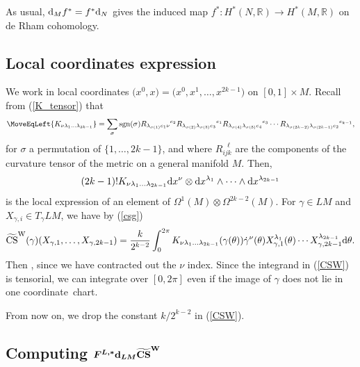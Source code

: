 \documentclass[pdftex]{sigma}
\numberwithin{equation}{section}
\theoremstyle{definition}
\newcommand{\BbR}{{\mathbb R}}
\newcommand{\R}{\BbR}
\newcommand{\bm}{ M}
\newcommand{\ocs}{\widetilde{{\rm CS}}}
\newcommand{\sgn}{{\rm sgn}}
\newcommand{\itbm}{[0,1]\times M}
\begin{document}
As usual, ${\rm d}_Mf^* = f^*{\rm d}_N$ gives the induced map $f^*\colon H^*(N,\R) \to H^*(M,\R)$ on de Rham cohomology.

\subsection{Local coordinates expression}%

We work in local coordinates
$\bigl(x^0, x\bigr) = \bigl(x^0, x^1,\dots, x^{2k-1}\bigr)$ on $\itbm$.
Recall from (\ref{K_tensor}) that%
\begin{align*}%
\MoveEqLeft{ K_{\nu \lambda_1 \dots \lambda_{2k-1}} }
= \sum_{\sigma } \sgn({\sigma})
R_{\lambda_{\sigma (1)} e_1 \nu}{}^{e_{2}}
R_{\lambda_{\sigma (2) } \lambda_{\sigma (3)} e_{3}}{}^{e_1}
R_{\lambda_{\sigma (4) } \lambda_{\sigma (5)} e_{4}}{}^{e_{3}}
\cdots
R_{\lambda_{\sigma (2k-2) } \lambda_{\sigma (2k-1)} e_{2}}{}^{e_{k-1}},
\nonumber
\end{align*}
for $\sigma$ a permutation of $\{1,\dots,2k-1\}$, and where $R_{ijk}^{\ \ \ \ell}$ are the components of the curvature tensor of the metric on a general manifold $M$. Then,
\begin{equation}\label{K}(2k-1)! K_{\nu \lambda_1 \dots \lambda_{2k-1}}{\rm d}x^\nu\otimes {\rm d}x^{\lambda_1}\wedge\cdots\wedge {\rm d}x^{\lambda_{2k-1}}
\end{equation}
is the local expression of an element of
$\Omega^1( {\bm}) \otimes \Omega^{2k-2} (\bm)$.
For $\gamma\in L\bm$ and $X_{\gamma,i}\in T_\gamma L\bm$, we have by (\ref{csg})
\begin{equation}
\label{CSW}
\ocs^{\rm W} (\gamma ) (X_{\gamma, 1} ,\dots, X_{\gamma , 2k-1}) \\
= \frac{k}{2^{k-2}}\int_0^{2\pi}
 K_{\nu \lambda_1 \dots \lambda_{2k-1}} (\gamma (\theta))
{\dot \gamma}^{\nu} (\theta )
X_{\gamma ,1}^{\lambda_{1}}(\theta ) \cdots X_{\gamma , 2k-1}^{\lambda_{2k-1}}
 {\rm d}\theta.
\end{equation}
Then \smash{$\ocs^{\rm W}
\in \Omega^{2k-1} (L{\bm})$}, since we have contracted out the $\nu$ index. Since the integrand in (\ref{CSW}) is tensorial, we can integrate over $[0, 2\pi]$ even if the image of $\gamma$ does not lie in one coordinate~chart.

From now on, we drop the constant $k/2^{k-2}$ in (\ref{CSW}).

\subsection[Computing F\^{}\{L,*\} d\_\{LM\} CS\^{}W]{Computing $\boldsymbol{F^{L,*}{\rm d}_{L\bm} \ocs^{\rm W}}$}%
\end{document}
